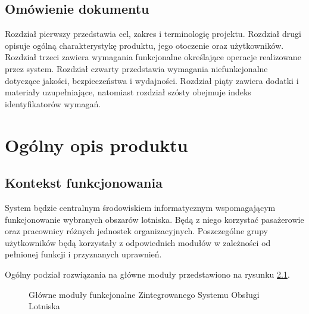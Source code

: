 \documentclass[12pt,a4paper,oneside]{report}
\begin{document}
\section{Omówienie dokumentu}
Rozdział pierwszy przedstawia cel, zakres i terminologię projektu. Rozdział drugi opisuje ogólną charakterystykę produktu, jego otoczenie oraz użytkowników. Rozdział trzeci zawiera wymagania funkcjonalne określające operacje realizowane przez system. Rozdział czwarty przedstawia wymagania niefunkcjonalne dotyczące jakości, bezpieczeństwa i wydajności. Rozdział piąty zawiera dodatki i materiały uzupełniające, natomiast rozdział szósty obejmuje indeks identyfikatorów wymagań.

\chapter{Ogólny opis produktu}

\section{Kontekst funkcjonowania}
System będzie centralnym środowiskiem informatycznym wspomagającym funkcjonowanie wybranych obszarów lotniska. Będą z niego korzystać pasażerowie oraz pracownicy różnych jednostek organizacyjnych. Poszczególne grupy użytkowników będą korzystały z odpowiednich modułów w zależności od pełnionej funkcji i przyznanych uprawnień.

Ogólny podział rozwiązania na główne moduły przedstawiono na rysunku \ref{fig:moduly-systemu}.

\begin{figure}[H]
    \centering
    \caption{Główne moduły funkcjonalne Zintegrowanego Systemu Obsługi Lotniska}
    \label{fig:moduly-systemu}
\end{figure}
\end{document}
